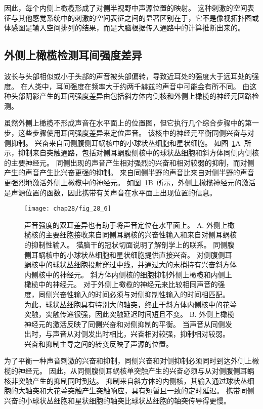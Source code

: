 因此，每个内侧上橄榄形成了对侧半视野中声源位置的映射。
这种刺激的空间表征与其他感觉系统中的刺激的空间表征之间的显著区别在于，它不是像视拓扑图或体感图是输入空间排列的结果，而是大脑根据传入通路中的计算推断出来的。



\subsection{外侧上橄榄检测耳间强度差异}

波长与头部相似或小于头部的声音被头部偏转，导致近耳处的强度大于远耳处的强度。
在人类中，耳间强度在频率大于约两千赫兹的声音中可能会有所不同。
由这种头部阴影产生的耳间强度差异由包括斜方体内侧核和外侧上橄榄的神经元回路检测。


虽然外侧上橄榄不形成声音在水平面上的位置图，但它执行几个综合步骤中的第一步，这些步骤使用耳间强度差异来定位声音。
该核中的神经元平衡同侧兴奋与对侧抑制。
兴奋来自同侧腹侧耳蜗核中的小球状丛细胞和星状细胞。
如图~\ref{fig:28_6}A~所示，抑制来自突触通路，包括对侧耳蜗腹侧核中的球状丛细胞和斜方体同侧内侧核的主要神经元。
同侧出现的声音产生相对强烈的兴奋和相对较弱的抑制，而对侧产生的声音产生比兴奋更强的抑制。
来自同侧半野的声音比来自对侧半野的声音更强烈地激活外侧上橄榄中的神经元。
如图~\ref{fig:28_6}B~所示，外侧上橄榄神经元的激活是声源位置的函数，因此携带有关声音在水平面上出现位置的信息。


\begin{figure}[htbp]
	\centering
	\texttt{[image: chap28/fig\_28\_6]}
	\caption{声音强度的双耳差异也有助于将声音定位在水平面上。
		A. 外侧上橄榄核的主要细胞接收来自同侧耳蜗核的兴奋性输入和来自对侧耳蜗核的抑制性输入。
		猫脑干的冠状切面说明了解剖学上的联系。
		同侧腹侧耳蜗核中的小球状丛细胞和星状细胞提供直接兴奋。 
		对侧腹侧耳蜗核中的球状丛细胞投射穿过中线，并通过大的末梢持有兴奋斜方体内侧核中的神经元。
		斜方体内侧核的细胞抑制外侧上橄榄和内侧上橄榄中的神经元。
		对于外侧上橄榄的神经元来比较相同声音的强度，同侧兴奋性输入的时间必须与对侧抑制性输入的时间相匹配。
		为此，球状丛细胞具有特别大的轴突，终止于斜方体内侧核中的花萼突触，突触传递很强，因此突触延迟时间短且不变。
		B. 外侧上橄榄神经元的激活反映了同侧兴奋和对侧抑制的平衡。
		当声音从同侧发出时，与声音从对侧发出时相比，兴奋相对较强，抑制相对较弱。
		兴奋和抑制主导之间的转变反映了声源的位置。}
	\label{fig:28_6}
\end{figure}


为了平衡一种声音刺激的兴奋和抑制，同侧兴奋和对侧抑制必须同时到达外侧上橄榄的神经元。
因此，从同侧腹侧耳蜗核单突触产生的兴奋必须与从对侧腹侧耳蜗核非突触产生的抑制同时到达。
抑制来自斜方体的内侧核，其输入通过球状丛细胞的大轴突和大花萼突触产生突触响应，具有短暂且一致的定时延迟。
携带同侧兴奋的小球状丛细胞和星状细胞的轴突比球状丛细胞的轴突传导得更慢。



